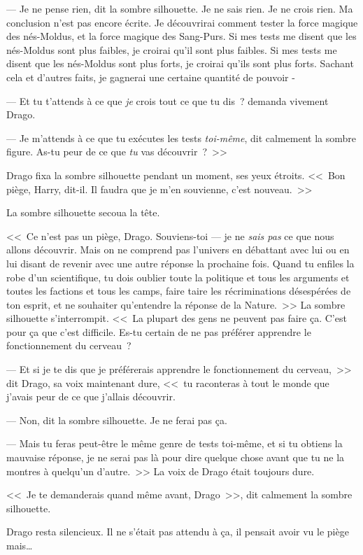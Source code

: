 --- Je ne pense rien, dit la sombre silhouette. Je ne sais rien. Je ne crois rien. Ma conclusion n'est pas encore écrite. Je découvrirai comment tester la force magique des nés-Moldus, et la force magique des Sang-Purs. Si mes tests me disent que les nés-Moldus sont plus faibles, je croirai qu'il sont plus faibles. Si mes tests me disent que les nés-Moldus sont plus forts, je croirai qu'ils sont plus forts. Sachant cela et d'autres faits, je gagnerai une certaine quantité de pouvoir -

--- Et tu t'attends à ce que \emph{je} crois tout ce que tu dis~? demanda vivement Drago.

--- Je m'attends à ce que tu exécutes les tests \emph{toi-même}, dit calmement la sombre figure. As-tu peur de ce que \emph{tu} vas découvrir~?~>>

Drago fixa la sombre silhouette pendant un moment, ses yeux étroits. <<~Bon piège, Harry, dit-il. Il faudra que je m'en souvienne, c'est nouveau.~>>

La sombre silhouette secoua la tête.

<<~Ce n'est pas un piège, Drago. Souviens-toi — je ne \emph{sais pas} ce que nous allons découvrir. Mais on ne comprend pas l'univers en débattant avec lui ou en lui disant de revenir avec une autre réponse la prochaine fois. Quand tu enfiles la robe d'un scientifique, tu dois oublier toute la politique et tous les arguments et toutes les factions et tous les camps, faire taire les récriminations désespérées de ton esprit, et ne souhaiter qu'entendre la réponse de la Nature.~>> La sombre silhouette s'interrompit. <<~La plupart des gens ne peuvent pas faire ça. C'est pour ça que c'est difficile. Es-tu certain de ne pas préférer apprendre le fonctionnement du cerveau~?

--- Et si je te dis que je préférerais apprendre le fonctionnement du cerveau,~>> dit Drago, sa voix maintenant dure, <<~tu raconteras à tout le monde que j'avais peur de ce que j'allais découvrir.

--- Non, dit la sombre silhouette. Je ne ferai pas ça.

--- Mais tu feras peut-être le même genre de tests toi-même, et si tu obtiens la mauvaise réponse, je ne serai pas là pour dire quelque chose avant que tu ne la montres à quelqu'un d'autre.~>> La voix de Drago était toujours dure.

<<~Je te demanderais quand même avant, Drago~>>, dit calmement la sombre silhouette.

Drago resta silencieux. Il ne s'était pas attendu à ça, il pensait avoir vu le piège mais…

